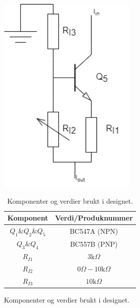 \begin{figure}[H]
    \centering
    \begin{minipage}[c]{0.4\textwidth}
        \centering
        \includegraphics[width=0.6\textwidth]{Bilder/current_source.drawio.png} 
        \caption{Realisert strømkilde.}
        \label{fig:CurrentSource}
    \end{minipage}
    \begin{minipage}[c]{0.4\textwidth}
        \begin{table}[H]
            \caption{Komponenter og verdier brukt i designet.}
            \label{tab:komnpomenter}
            \begin{tabular}{ |c|c| }
                \hline
                Komponent & Verdi/Produknummer \\ \hline
                \hline
                $Q_1 \& Q_2 \&Q_5$ & BC547A (NPN) \\
                $Q_3 \& Q_4$ & BC557B (PNP) \\
                $R_{I1}$ & $3\text{k}\Omega $ \\
                $R_{I2}$ & $0\Omega - 10\text{k}\Omega$ \\
                $R_{I3}$ & $10\text{k}\Omega$ \\
                \hline
            \end{tabular}
            
        \end{table}
    \end{minipage}
\end{figure}

